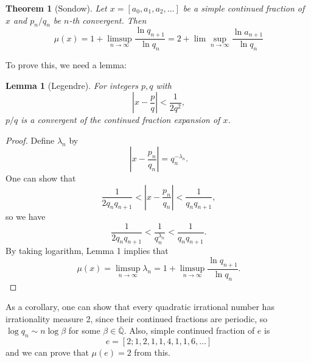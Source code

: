 \documentclass{article}
\newtheorem{theorem}{Theorem}
\newtheorem{lemma}{Lemma}
\begin{document}
\begin{theorem}[Sondow]
Let $x = [a_{0}, a_{1}, a_{2}, \dots]$ be a simple continued fraction of $x$ and $p_{n}/q_{n}$ be $n$-th convergent. Then 
$$
\mu(x) = 1 + \limsup_{n\to\infty} \frac{\ln q_{n+1}}{\ln q_{n}} = 2 + \lim\sup_{n\to \infty} \frac{\ln a_{n+1}}{\ln q_{n}}
$$
\end{theorem}
To prove this, we need a lemma:
\begin{lemma}[Legendre]
For integers $p, q$ with 
$$
\left| x-\frac{p}{q}\right|  < \frac{1}{2q^{2}}, 
$$
$p/q$ is a convergent of the continued fraction expansion of $x$. 
\end{lemma}
\begin{proof}
Define $\lambda_{n}$ by 
$$
\left| x- \frac{p_{n}}{q_{n}}\right| = q_{n}^{-\lambda_{n}}. 
$$
One can show that 
$$
\frac{1}{2q_{n}q_{n+1}}< \left|x-\frac{p_{n}}{q_{n}}\right| <\frac{1}{q_{n}q_{n+1}}, 
$$
so we have 
$$
\frac{1}{2q_{n}q_{n+1}} < \frac{1}{q_{n}^{\lambda_{n}}} < \frac{1}{q_{n}q_{n+1}}. 
$$
By taking logarithm, Lemma 1 implies that
$$\mu(x) = \limsup_{n\to\infty} \lambda_{n} = 1 +  \limsup_{n\to\infty} \frac{\ln q_{n+1}}{\ln q_{n}}. $$
\end{proof}
As a corollary,  one can show that every quadratic irrational number has irrationality measure 2, since their continued fractions are periodic, so $\log q_{n}\sim n\log \beta$ for some $\beta\in \overline{\mathbb{Q}}$. Also, simple continued fraction of $e$ is
$$
e = [2;1, 2, 1, 1, 4, 1, 1, 6, \dots]
$$
and we can prove that $\mu(e) = 2$ from this. 
\end{document}
